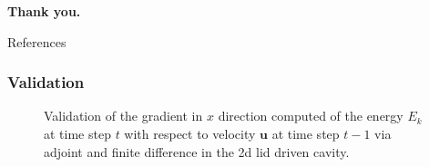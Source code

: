 \begin{frame}
  \begin{center}
    {\Huge \bf Thank you.}
  \end{center}
\end{frame}

\begin{frame}{References}


\end{frame}


\begin{frame}
  \frametitle{Validation}
\begin{figure}
  \centering
  \caption{Validation of the gradient in $x$
  direction computed of the energy $E_k$ at time step $t$ with respect to
  velocity $\mathbf{u}$ at time step $t-1$ via adjoint and finite
  difference in the 2d lid driven cavity.}
  \label{fig:fd}
\end{figure}
\end{frame}

